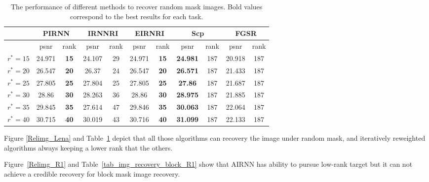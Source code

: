 \documentclass[twoside,11pt]{article}
\numberwithin{equation}{section}
\begin{document}
\begin{table}[bthp]
  \begin{tabular}{ccccccccccc}
    \toprule
                         & \multicolumn{2}{c}{PIRNN} & \multicolumn{2}{c}{IRNNRI} & \multicolumn{2}{c}{EIRNRI} & \multicolumn{2}{c}{Scp} & \multicolumn{2}{c}{FGSR} \\
    \hline
                       & psnr      & rank          & psnr          & rank       & psnr      & rank           & psnr             & rank & psnr         & rank      \\
    \hline
$r^{*}=15$ & 24.971    & \textbf{15}   & 24.107        & 29         & 24.971    & \textbf{15}    & \textbf{24.981}  & 187  & 20.918       & 187       \\
$r^{*}=20$ & 26.547    & \textbf{20}   & 26.37         & 24         & 26.547    & \textbf{20}    & \textbf{26.571}  & 187  & 21.433       & 187       \\
$r^{*}=25$ & 27.805    & \textbf{25}   & 27.804        & 25         & 27.805    & \textbf{25}    & \textbf{27.86}   & 187  & 21.687       & 187       \\
$r^{*}=30$ & 28.86     & \textbf{30}   & 28.263        & 36         & 28.86     & \textbf{30}    & \textbf{28.975}  & 187  & 21.885       & 187       \\
$r^{*}=35$ & 29.845    & \textbf{35}   & 27.614        & 47         & 29.846    & \textbf{35}    & \textbf{30.063}  & 187  & 22.064       & 187       \\
$r^{*}=40$ & 30.715    & \textbf{40}   & 30.019        & 43         & 30.716    & \textbf{40}    & \textbf{31.099}  & 187  & 22.133       & 187       \\
  \bottomrule
\end{tabular}
\captionsetup{singlelinecheck=off, justification=raggedright}
  \caption{The performance of different methods to recover random mask images. Bold values correspond to the best results for each task.}
  \label{tab_img_recovery_rand_Lena}
\end{table}



Figure \ref{Relimg_Lena} and Table~\ref{tab_img_recovery_rand_Lena} depict that all those algorithms can recovery the image under random mask, and iteratively reweighted algorithms always keeping a lower rank that the others. 


Figure~\ref{Relimg_R1} and Table~\ref{tab_img_recovery_block_R1} show that AIRNN has ability to pursue low-rank target but it can not achieve a credible recovery for block mask image recovery.
\end{document}
